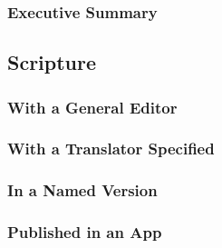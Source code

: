 \documentclass{ltxdockit}
\begin{document}
\subsubsection{Executive Summary} %
\label{sub:executive_summary}
\begin{refsection}
	\printbibliography[heading=none]
\end{refsection}

\subsection{Scripture} %
\label{sec:scripture}
\subsubsection{With a General Editor} %
\label{sub:with_a_general_editor}
\begin{refsection}
	\printbibliography[heading=none]
\end{refsection}
\subsubsection{With a Translator Specified} %
\label{sub:with_a_translator_specified}
\begin{refsection}
	\printbibliography[heading=none]
\end{refsection}
\subsubsection{In a Named Version} %
\label{sub:in_a_named_version}
\begin{refsection}
	\printbibliography[heading=none]
\end{refsection}
\subsubsection{Published in an App} %
\label{sub:published_in_an_app_script}
\begin{refsection}
	\printbibliography[heading=none]
\end{refsection}
\end{document}

